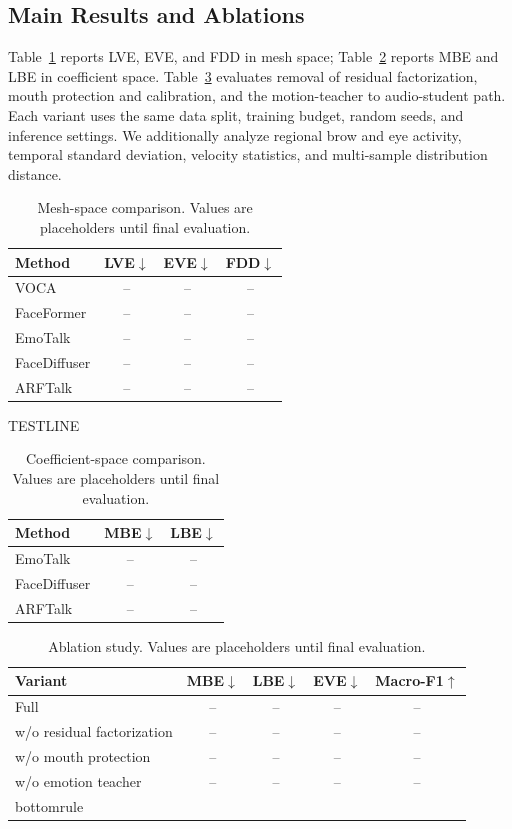 \documentclass[conference]{IEEEtran}
\begin{document}
\subsection{Main Results and Ablations}
Table~\ref{tab:main} reports LVE, EVE, and FDD in mesh space; Table~\ref{tab:coef} reports MBE and LBE in coefficient space. Table~\ref{tab:ablation} evaluates removal of residual factorization, mouth protection and calibration, and the motion-teacher to audio-student path. Each variant uses the same data split, training budget, random seeds, and inference settings. We additionally analyze regional brow and eye activity, temporal standard deviation, velocity statistics, and multi-sample distribution distance.
\begin{table}[t]
\centering
\caption{Mesh-space comparison. Values are placeholders until final evaluation.}
\label{tab:main}
\begin{tabular}{lccc}\toprule
Method & LVE$\downarrow$ & EVE$\downarrow$ & FDD$\downarrow$\\\midrule
VOCA & -- & -- & --\\
FaceFormer & -- & -- & --\\
EmoTalk & -- & -- & --\\
FaceDiffuser & -- & -- & --\\
ARFTalk & -- & -- & --\\\bottomrule
\end{tabular}
\end{table}
TESTLINE
\begin{table}[t]
\centering
\caption{Coefficient-space comparison. Values are placeholders until final evaluation.}
\label{tab:coef}
\begin{tabular}{lcc}\toprule
Method & MBE$\downarrow$ & LBE$\downarrow$\\\midrule
EmoTalk & -- & --\\
FaceDiffuser & -- & --\\
ARFTalk & -- & --\\\bottomrule
\end{tabular}
\end{table}
\begin{table}[t]
\centering
\caption{Ablation study. Values are placeholders until final evaluation.}
\label{tab:ablation}
\begin{tabular}{lcccc}\toprule
Variant & MBE$\downarrow$ & LBE$\downarrow$ & EVE$\downarrow$ & Macro-F1$\uparrow$\\\midrule
Full & -- & -- & -- & --\\
w/o residual factorization & -- & -- & -- & --\\
w/o mouth protection & -- & -- & -- & --\\
w/o emotion teacher & -- & -- & -- & --\\bottomrule
\end{tabular}
\end{table}
\end{document}
